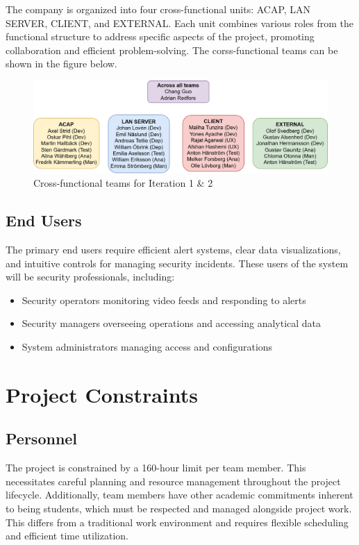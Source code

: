 The company is organized into four cross-functional units: ACAP, LAN SERVER, CLIENT, and EXTERNAL. Each unit combines various roles from the functional structure to address specific aspects of the project, promoting collaboration and efficient problem-solving. The corss-functional teams can be shown in the figure below.

\begin{figure}[h]
    \centering
    \includegraphics[width=0.5\linewidth]{NewCrossFunctional.drawio.png}
    \caption{Cross-functional teams for Iteration 1 \& 2}
    \label{fig:enter-label}
\end{figure}
    
\subsection{End Users}
The primary end users require efficient alert systems, clear data visualizations, and intuitive controls for managing security incidents. These users of the system will be security professionals, including:
    
\begin{itemize}
    \item Security operators monitoring video feeds and responding to alerts
    \item Security managers overseeing operations and accessing analytical data
    \item System administrators managing access and configurations
\end{itemize}
    

    
\section{Project Constraints}
    
\subsection{Personnel}
The project is constrained by a 160-hour limit per team member. This necessitates careful planning and resource management throughout the project lifecycle. Additionally, team members have other academic commitments inherent to being students, which must be respected and managed alongside project work. This differs from a traditional work environment and requires flexible scheduling and efficient time utilization.
    
